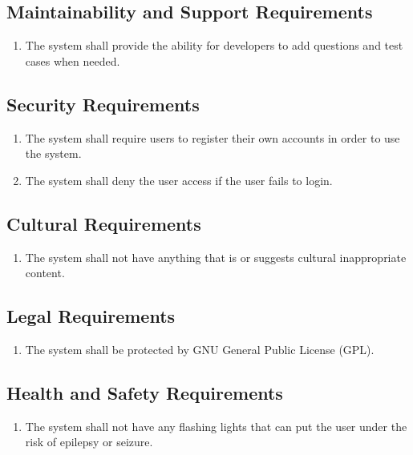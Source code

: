 \documentclass[12pt, titlepage]{article}
\begin{document}
\subsection{Maintainability and Support Requirements}
\begin{enumerate}[label=NFR.\arabic*, resume]
    \item The system shall provide the ability for developers to add questions and test cases when needed.
\end{enumerate}
\subsection{Security Requirements}
\begin{enumerate}[label=NFR.\arabic*, resume]
    \item The system shall require users to register their own accounts in order to use the system.
    \item The system shall deny the user access if the user fails to login.
\end{enumerate}
\subsection{Cultural Requirements}
\begin{enumerate}[label=NFR.\arabic*, resume]
    \item The system shall not have anything that is or suggests cultural inappropriate content. 
\end{enumerate}
\subsection{Legal Requirements}
\begin{enumerate}[label=NFR.\arabic*, resume]
    \item The system shall be protected by GNU General Public License (GPL). 
\end{enumerate}
\subsection{Health and Safety Requirements}
\begin{enumerate}[label=NFR.\arabic*, resume]
    \item The system shall not have any flashing lights that can put the user under the risk of epilepsy or seizure.
\end{enumerate}
\end{document}
